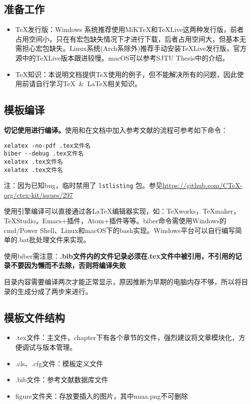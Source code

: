 \subsection{准备工作}
\begin{itemize}
  \item \TeX 发行版：Windows 系统推荐使用MiKTeX和\TeX Live这两种发行版，前者占用空间小，只在有宏包缺失情况下才进行下载，后者占用空间大，但基本无需担心宏包缺失。Linux系统(Arch系除外)推荐手动安装\TeX Live发行版，官方源中的TeXLive版本跟进较慢。macOS可以参考SJTU Thesis中的介绍。
  \item \TeX 知识：本说明文档提供\TeX 使用的例子，但不能解决所有的问题，因此使用前请自行学习\TeX~\&~\LaTeX 相关知识。
\end{itemize}

\subsection{模板编译}

\textbf{切记使用\XeLaTeX 进行编译。}使用\XeLaTeX 和在文档中加入参考文献的流程可参考如下命令：

\iffalse
\begin{lstlisting}[basicstyle=\small\ttfamily, caption=手动逐次编译, numbers=none]
xelatex -no-pdf .tex文件名
biber --debug .tex文件名
xelatex .tex文件名
xelatex .tex文件名
\end{lstlisting}
\else
\begin{verbatim}
xelatex -no-pdf .tex文件名
biber --debug .tex文件名
xelatex .tex文件名
xelatex .tex文件名
\end{verbatim}
注：因为已知bug，临时禁用了 \texttt{lstlisting} 包。参见\url{https://github.com/CTeX-org/ctex-kit/issues/297}
\fi

使用\XeLaTeX 引擎编译可以直接通过各\LaTeX 编辑器实现，如：TeXworks，TeXmaker，TeXStudio，Emacs+插件，Atom+插件等等。biber命令需使用Windows的cmd/Power Shell、Linux和macOS下的bash实现。Windows平台可以自行编写简单的.bat批处理文件来实现。

使用biber需注意：\textbf{.bib文件内的文件记录必须在.tex文件中被引用，不引用的记录不要因为懒而不去除，否则将编译失败}

目录内容需要编译两次才能正常显示，原因推断为早期的电脑内存不够，所以将目录的生成分成了两步来进行。

\subsection{模板文件结构}
\begin{itemize}[noitemsep,topsep=0pt,parsep=0pt,partopsep=0pt]
  \item .tex文件：主文件，chapter下有各个章节的文件，强烈建议将文章模块化，方便调试与版本管理。
  \item .cls、.cfg文件：模板定义文件
  \item .bib文件：参考文献数据库文件
  \item figure文件夹：存放要插入的图片，其中nuaa.png不可删除
\end{itemize}
